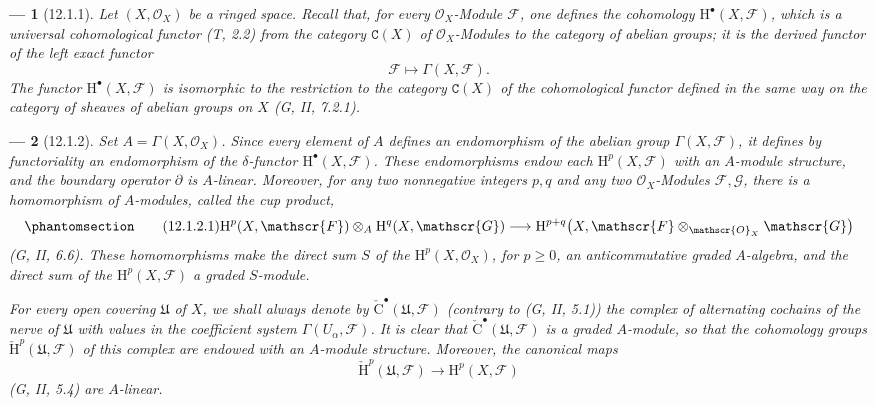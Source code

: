 \documentclass[oneside]{amsart}
\theoremstyle{ega-env-style}
\newtheorem*{env}{---}
\theoremstyle{ega-thm-env-style}
\theoremstyle{ega-defn-env-style}
\def\mathcal{\mathscr}
\def\sh{\mathcal}                   %
\def\cat{\mathtt}                   %
\def\geq{\geqslant}                 %
\def\HH{\mathrm{H}}                 %
\newcommand{\oldpage}[2][]{{\marginnote{\normalfont{\textbf{#1}~|~#2}}}\ignorespaces}
\let\EGAOriginalLabel\label
\renewcommand{\label}[1]{\phantomsection\EGAOriginalLabel{#1}}
\begin{document}
\begin{env}[12.1.1]
\label{0.12.1.1}
\oldpage[0\textsubscript{III}]{49}
Let $(X,\sh{O}_X)$ be a ringed space.
Recall that, for every $\sh{O}_X$-Module $\sh{F}$, one defines the
cohomology $\HH^\bullet(X,\sh{F})$, which is a universal cohomological
functor (T, 2.2) from the category $\cat{C}(X)$ of
$\sh{O}_X$-Modules to the category of abelian groups; it is the derived
functor of the left exact functor
\[
  \sh{F}\longmapsto\Gamma(X,\sh{F}).
\]
The functor $\HH^\bullet(X,\sh{F})$ is isomorphic
\oldpage[0\textsubscript{III}]{50}
to the restriction to the category $\cat{C}(X)$ of the cohomological
functor defined in the same way on the category of sheaves of abelian
groups on $X$ (G, II, 7.2.1).
\end{env}

\begin{env}[12.1.2]
\label{0.12.1.2}
Set $A=\Gamma(X,\sh{O}_X)$.
Since every element of $A$ defines an endomorphism of the abelian group
$\Gamma(X,\sh{F})$, it defines by functoriality an endomorphism of the
$\delta$-functor $\HH^\bullet(X,\sh{F})$.
These endomorphisms endow each $\HH^p(X,\sh{F})$ with an
$A$-module structure, and the boundary operator $\partial$ is
$A$-linear.
Moreover, for any two nonnegative integers $p,q$ and any two
$\sh{O}_X$-Modules $\sh{F},\sh{G}$, there is a homomorphism of
$A$-modules, called the \emph{cup product},
\[
\label{0.12.1.2.1}
\tag{12.1.2.1}
  \HH^p(X,\sh{F})\otimes_A\HH^q(X,\sh{G})
  \longrightarrow
  \HH^{p+q}\bigl(X,\sh{F}\otimes_{\sh{O}_X}\sh{G}\bigr)
\]
(G, II, 6.6).
These homomorphisms make the direct sum $S$ of the
$\HH^p(X,\sh{O}_X)$, for $p\geq0$, an anticommutative graded
$A$-algebra, and the direct sum of the $\HH^p(X,\sh{F})$ a graded
$S$-module.

For every open covering $\mathfrak{U}$ of $X$, we shall always denote
by $\check{\mathrm{C}}^\bullet(\mathfrak{U},\sh{F})$ (contrary to
(G, II, 5.1)) the complex of alternating cochains of the nerve of
$\mathfrak{U}$ with values in the coefficient system
$\Gamma(U_\alpha,\sh{F})$.
It is clear that
$\check{\mathrm{C}}^\bullet(\mathfrak{U},\sh{F})$ is a graded
$A$-module, so that the cohomology groups
$\check{\HH}^p(\mathfrak{U},\sh{F})$ of this complex are endowed with
an $A$-module structure.
Moreover, the canonical maps
\[
  \check{\HH}^p(\mathfrak{U},\sh{F})
  \longrightarrow
  \HH^p(X,\sh{F})
\]
(G, II, 5.4) are $A$-linear.
\end{env}
\end{document}
